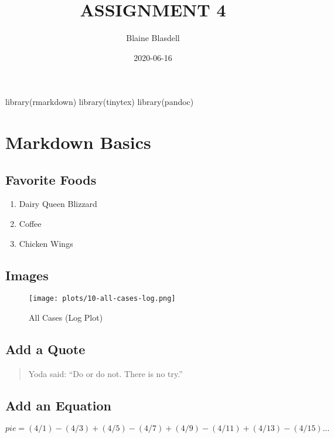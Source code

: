 \documentclass[
]{article}
\title{ASSIGNMENT 4}
\author{Blaine Blasdell}
\date{2020-06-16}
\providecommand{\tightlist}{%
  \setlength{\itemsep}{0pt}\setlength{\parskip}{0pt}}
\begin{document}
\maketitle

library(rmarkdown) library(tinytex) library(pandoc)

\hypertarget{markdown-basics}{%
\section{Markdown Basics}\label{markdown-basics}}

\hypertarget{favorite-foods}{%
\subsection{Favorite Foods}\label{favorite-foods}}

\begin{enumerate}
\def\labelenumi{\arabic{enumi}.}
\tightlist
\item
  Dairy Queen Blizzard
\item
  Coffee
\item
  Chicken Wings
\end{enumerate}

\hypertarget{images}{%
\subsection{Images}\label{images}}

\begin{figure}
\centering
\texttt{[image: plots/10-all-cases-log.png]}
\caption{All Cases (Log Plot)}
\end{figure}

\hypertarget{add-a-quote}{%
\subsection{Add a Quote}\label{add-a-quote}}

\begin{quote}
Yoda said: ``Do or do not. There is no try.''
\end{quote}

\hypertarget{add-an-equation}{%
\subsection{Add an Equation}\label{add-an-equation}}

\[ pie = (4/1) - (4/3) + (4/5) - (4/7) + (4/9) - (4/11) + (4/13) - (4/15) ... \]
\end{document}
